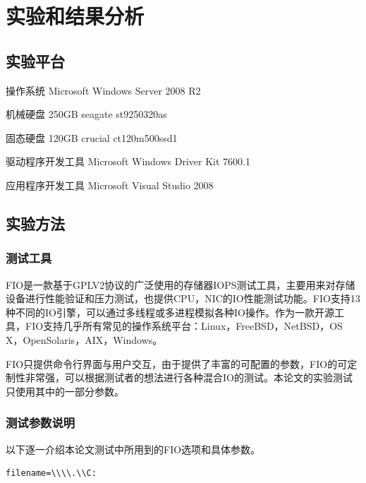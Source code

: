 
\chapter{实验和结果分析}
\label{cha:exp_analysis}

\section{实验平台}
\label{sec:exp_platform}

操作系统 Microsoft Windows Server 2008 R2

机械硬盘 250GB seagate st9250320as

固态硬盘 120GB crucial ct120m500ssd1

驱动程序开发工具 Microsoft Windows Driver Kit 7600.1

应用程序开发工具 Microsoft Visual Studio 2008

\section{实验方法}
\label{sec:exp_method}

\subsection{测试工具}
FIO是一款基于GPLV2协议的广泛使用的存储器IOPS测试工具，主要用来对存储设备进行性能验证和压力测试，也提供CPU，NIC的IO性能测试功能。FIO支持13种不同的IO引擎，可以通过多线程或多进程模拟各种IO操作。作为一款开源工具，FIO支持几乎所有常见的操作系统平台：Linux，FreeBSD，NetBSD，OS X，OpenSolaris，AIX，Windows。

FIO只提供命令行界面与用户交互，由于提供了丰富的可配置的参数，FIO的可定制性非常强，可以根据测试者的想法进行各种混合IO的测试。本论文的实验测试只使用其中的一部分参数。

\subsection{测试参数说明}

以下逐一介绍本论文测试中所用到的FIO选项和具体参数。

\begin{lstlisting}
filename=\\\\.\\C:
\end{lstlisting}

